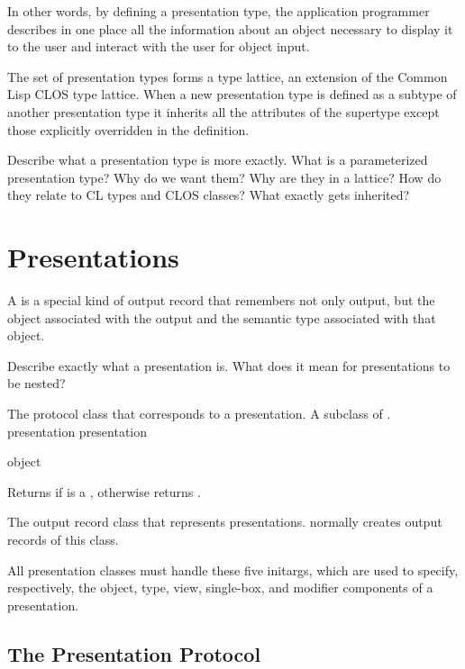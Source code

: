 In other words, by defining a presentation type, the application programmer
describes in one place all the information about an object necessary to display
it to the user and interact with the user for object input.

The set of presentation types forms a type lattice, an extension of the Common
Lisp CLOS type lattice.  When a new presentation type is defined as a subtype of
another presentation type it inherits all the attributes of the supertype except
those explicitly overridden in the definition.

 {Describe what a presentation type is more exactly.  What is a
parameterized presentation type?  Why do we want them?  Why are they in a
lattice?  How do they relate to CL types and CLOS classes?  What exactly gets
inherited?}


\section {Presentations}

A  is a special kind of output record that remembers not
only output, but the object associated with the output and the semantic type
associated with that object.

 {Describe exactly what a presentation is.  What does it mean for
presentations to be nested?}


The protocol class that corresponds to a presentation.  A subclass of
.
 {presentation} {presentation}

 {object}

Returns  if  is a , otherwise returns
.


The output record class that represents presentations.   normally
creates output records of this class.
\Mutable


All presentation classes must handle these five initargs, which are used to
specify, respectively, the object, type, view, single-box, and modifier
components of a presentation.


\subsection {The Presentation Protocol}

